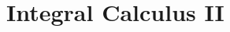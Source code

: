 \documentclass[../../main.tex]{subfiles}
\begin{document}
\chapter{Integral Calculus II}
\end{document}
